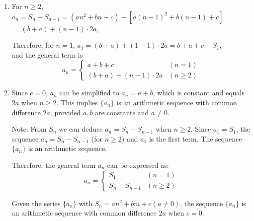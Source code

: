 \begin{enumerate}
    \item For \( n \geq 2 \), \( a_n = S_n - S_{n-1} = (an^2 + bn + c) - [a(n-1)^2 + b(n-1) + c] \) \\
    \( = (b+a) + (n-1) \cdot 2a \),
    
    Therefore, for \( n=1 \), \( a_1 = (b+a) + (1-1) \cdot 2a = b + a + c - S_1 \), \\
    and the general term is
    \[
    a_n = 
    \begin{cases}
        a + b + c & (n=1) \\
        (b+a) + (n-1) \cdot 2a & (n \geq 2)
    \end{cases}
    \]

    \item Since \( c = 0 \), \( a_n \) can be simplified to \( a_n = a + b \), which is constant and equals \( 2a \) when \( n \geq 2 \). This implies \( \{a_n\} \) is an arithmetic sequence with common difference \( 2a \), provided \( a, b \) are constants and \( a \neq 0 \).
    
    Note: From \( S_n \) we can deduce \( a_n = S_n - S_{n-1} \) when \( n \geq 2 \). Since \( a_1 = S_1 \), the sequence \( a_n = S_n - S_{n-1} \) (for \( n \geq 2 \)) and \( a_1 \) is the first term. The sequence \( \{a_n\} \) is an arithmetic sequence.
    
    Therefore, the general term \( a_n \) can be expressed as:
    \[
    a_n = 
    \begin{cases}
        S_1 & (n=1) \\
        S_n - S_{n-1} & (n \geq 2)
    \end{cases}
    \]
    
    Given the series \( \{a_n\} \) with \( S_n = an^2 + bm + c (a \neq 0) \), the sequence \( \{a_n\} \) is an arithmetic sequence with common difference \( 2a \) when \( c = 0 \).
\end{enumerate}

